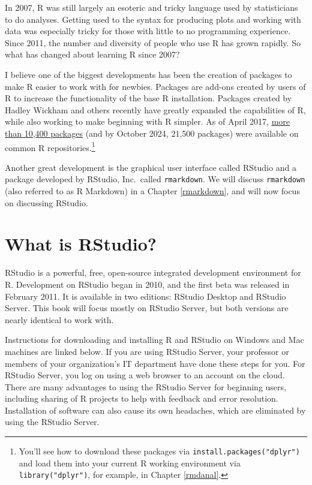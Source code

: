 \documentclass[]{tufte-book}
\begin{document}
In 2007, R was still largely an esoteric and tricky language used by statisticians to do analyses. Getting used to the syntax for producing plots and working with data was especially tricky for those with little to no programming experience. Since 2011, the number and diversity of people who use R has grown rapidly. So what has changed about learning R since 2007?

I believe one of the biggest developments has been the creation of packages to make R easier to work with for newbies. Packages are add-ons created by users of R to increase the functionality of the base R installation. Packages created by Hadley Wickham and others recently have greatly expanded the capabilities of R, while also working to make beginning with R simpler. As of April 2017, \href{https://cran.r-project.org/web/packages/index.html}{more than 10,400 packages} (and by October 2024, 21,500 packages) were available on common R repositories.\footnote{You'll see how to download these packages via \texttt{install.packages("dplyr")} and load them into your current R working environment via \texttt{library("dplyr")}, for example, in Chapter \ref{rmdanal}.}

Another great development is the graphical user interface called RStudio and a package developed by RStudio, Inc.~called \texttt{rmarkdown}. We will discuss \texttt{rmarkdown} (also referred to as R Markdown) in a Chapter \ref{rmarkdown}, and will now focus on discussing RStudio.

\section{What is RStudio?}\label{what-is-rstudio}

RStudio is a powerful, free, open-source integrated development environment for R. Development on RStudio began in 2010, and the first beta was released in February 2011. It is available in two editions: RStudio Desktop and RStudio Server. This book will focus mostly on RStudio Server, but both versions are nearly identical to work with.

Instructions for downloading and installing R and RStudio on Windows and Mac machines are linked below. If you are using RStudio Server, your professor or members of your organization's IT department have done these steps for you. For RStudio Server, you log on using a web browser to an account on the cloud. There are many advantages to using the RStudio Server for beginning users, including sharing of R projects to help with feedback and error resolution. Installation of software can also cause its own headaches, which are eliminated by using the RStudio Server.
\end{document}
